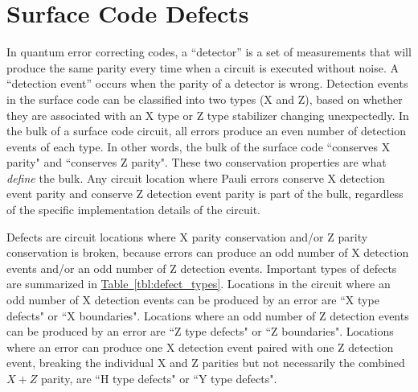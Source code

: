\documentclass[onecolumn,unpublished,a4paper]{quantumarticle}
\theoremstyle{definition}
\theoremstyle{definition}
\theoremstyle{definition}
\newcommand{\tbl}[1]{\hyperref[tbl:#1]{Table~\ref*{tbl:#1}}}
\begin{document}
\printbibliography

\appendix

\section{Surface Code Defects}
\label{app:defects}

\begin{table}
    \centering
    \caption{
        Summary of types of defects in surface code circuits.
    }
    \label{tbl:defect_types}
\end{table}

In quantum error correcting codes, a ``detector'' is a set of measurements that will produce the same parity every time when a circuit is executed without noise.
A ``detection event'' occurs when the parity of a detector is wrong.
Detection events in the surface code can be classified into two types (X and Z), based on whether they are associated with an X type or Z type stabilizer changing unexpectedly.
In the bulk of a surface code circuit, all errors produce an even number of detection events of each type.
In other words, the bulk of the surface code ``conserves X parity" and ``conserves Z parity".
These two conservation properties are what \emph{define} the bulk.
Any circuit location where Pauli errors conserve X detection event parity and conserve Z detection event parity is part of the bulk, regardless of the specific implementation details of the circuit.

Defects are circuit locations where X parity conservation and/or Z parity conservation is broken, because errors can produce an odd number of X detection events and/or an odd number of Z detection events.
Important types of defects are summarized in \tbl{defect_types}.
Locations in the circuit where an odd number of X detection events can be produced by an error are ``X type defects" or ``X boundaries".
Locations where an odd number of Z detection events can be produced by an error are ``Z type defects" or ``Z boundaries".
Locations where an error can produce one X detection event paired with one Z detection event, breaking the individual X and Z parities but not necessarily the combined $X+Z$ parity, are ``H type defects" or ``Y type defects".
\end{document}
